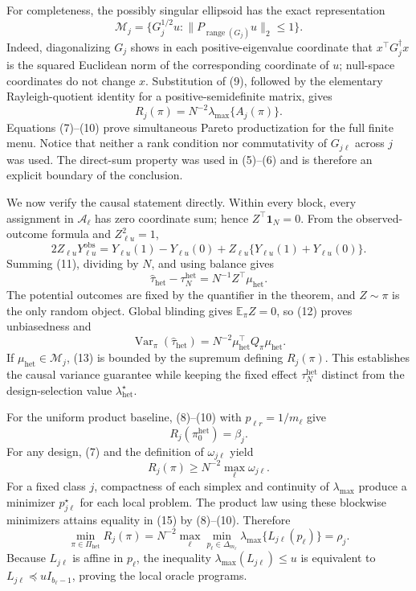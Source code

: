 For completeness, the possibly singular ellipsoid has the exact representation
\[
\mathcal M_j
=\{G_j^{1/2}u:\|P_{\operatorname{range}(G_j)}u\|_2\le1\}.
\tag{9}
\]
Indeed, diagonalizing \(G_j\) shows in each positive-eigenvalue coordinate that \(x^\top G_j^\dagger x\) is the squared Euclidean norm of the corresponding coordinate of \(u\); null-space coordinates do not change \(x\).  Substitution of (9), followed by the elementary Rayleigh-quotient identity for a positive-semidefinite matrix, gives
\[
R_j(\pi)=N^{-2}\lambda_{\max}\{A_j(\pi)\}.
\tag{10}
\]
Equations (7)--(10) prove simultaneous Pareto productization for the full finite menu.  Notice that neither a rank condition nor commutativity of \(G_{j\ell}\) across \(j\) was used.  The direct-sum property was used in (5)--(6) and is therefore an explicit boundary of the conclusion.

We now verify the causal statement directly.  Within every block, every assignment in \(\mathcal A_\ell\) has zero coordinate sum; hence \(Z^\top\mathbf1_N=0\).  From the observed-outcome formula and \(Z_{\ell u}^2=1\),
\[
2Z_{\ell u}Y_{\ell u}^{\mathrm{obs}}
=Y_{\ell u}(1)-Y_{\ell u}(0)
+Z_{\ell u}\{Y_{\ell u}(1)+Y_{\ell u}(0)\}.
\tag{11}
\]
Summing (11), dividing by \(N\), and using balance gives
\[
\widehat\tau_{\mathrm{het}}-\tau_N^{\mathrm{het}}
=N^{-1}Z^\top\mu_{\mathrm{het}}.
\tag{12}
\]
The potential outcomes are fixed by the quantifier in the theorem, and \(Z\sim\pi\) is the only random object.  Global blinding gives \(\mathbb E_\pi Z=0\), so (12) proves unbiasedness and
\[
\operatorname{Var}_\pi(\widehat\tau_{\mathrm{het}})
=N^{-2}\mu_{\mathrm{het}}^\top Q_\pi\mu_{\mathrm{het}}.
\tag{13}
\]
If \(\mu_{\mathrm{het}}\in\mathcal M_j\), (13) is bounded by the supremum defining \(R_j(\pi)\).  This establishes the causal variance guarantee while keeping the fixed effect \(\tau_N^{\mathrm{het}}\) distinct from the design-selection value \(\lambda_{\mathrm{het}}^\star\).

For the uniform product baseline, (8)--(10) with \(p_{\ell r}=1/m_\ell\) give
\[
R_j(\pi_0^{\mathrm{het}})=\beta_j.
\tag{14}
\]
For any design, (7) and the definition of \(\omega_{j\ell}\) yield
\[
R_j(\pi)\ge N^{-2}\max_\ell\omega_{j\ell}.
\tag{15}
\]
For a fixed class \(j\), compactness of each simplex and continuity of \(\lambda_{\max}\) produce a minimizer \(p_{j\ell}^\star\) for each local problem.  The product law using these blockwise minimizers attains equality in (15) by (8)--(10).  Therefore
\[
\min_{\pi\in\Pi_{\mathrm{het}}}R_j(\pi)
=N^{-2}\max_\ell\min_{p_\ell\in\Delta_{m_\ell}}
\lambda_{\max}\{L_{j\ell}(p_\ell)\}
=\rho_j.
\tag{16}
\]
Because \(L_{j\ell}\) is affine in \(p_\ell\), the inequality \(\lambda_{\max}(L_{j\ell})\le u\) is equivalent to \(L_{j\ell}\preceq uI_{b_\ell-1}\), proving the local oracle programs.

